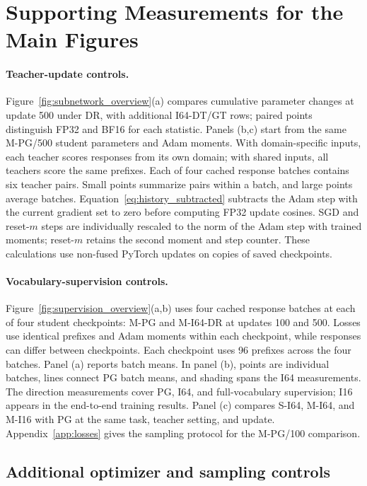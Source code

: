 \section{Supporting Measurements for the Main Figures}
\label{app:nine_panel_support}


\paragraph{Teacher-update controls.}
Figure~\ref{fig:subnetwork_overview}(a) compares cumulative parameter changes at update 500 under DR, with additional I64-DT/GT rows; paired points distinguish FP32 and BF16 for each statistic. Panels (b,c) start from the same M-PG/500 student parameters and Adam moments. With domain-specific inputs, each teacher scores responses from its own domain; with shared inputs, all teachers score the same prefixes. Each of four cached response batches contains six teacher pairs. Small points summarize pairs within a batch, and large points average batches. Equation~\ref{eq:history_subtracted} subtracts the Adam step with the current gradient set to zero before computing FP32 update cosines. SGD and reset-$m$ steps are individually rescaled to the norm of the Adam step with trained moments; reset-$m$ retains the second moment and step counter. These calculations use non-fused PyTorch updates on copies of saved checkpoints.

\paragraph{Vocabulary-supervision controls.}
Figure~\ref{fig:supervision_overview}(a,b) uses four cached response batches at each of four student checkpoints: M-PG and M-I64-DR at updates 100 and 500. Losses use identical prefixes and Adam moments within each checkpoint, while responses can differ between checkpoints. Each checkpoint uses 96 prefixes across the four batches. Panel (a) reports batch means. In panel (b), points are individual batches, lines connect PG batch means, and shading spans the I64 measurements. The direction measurements cover PG, I64, and full-vocabulary supervision; I16 appears in the end-to-end training results. Panel (c) compares S-I64, M-I64, and M-I16 with PG at the same task, teacher setting, and update. Appendix~\ref{app:losses} gives the sampling protocol for the M-PG/100 comparison.

\subsection{Additional optimizer and sampling controls}
\label{app:added_controls}

